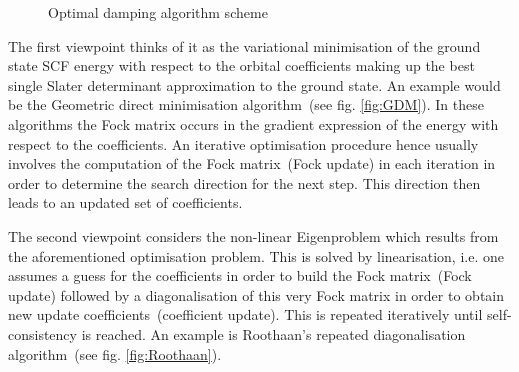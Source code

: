 \begin{figure}

	\centering
	\caption{Optimal damping algorithm scheme}
	\label{fig:ODA}
\end{figure}

The first viewpoint thinks of it as the variational minimisation
of the ground
state SCF energy with respect to the orbital coefficients making up
the best single Slater determinant approximation to the ground state.
An example would be the Geometric direct minimisation algorithm~(see fig. \ref{fig:GDM}).
In these algorithms the Fock matrix occurs in the gradient expression
of the energy with respect to the coefficients.
An iterative optimisation procedure hence
usually involves the computation of the Fock matrix~(Fock update)
in each iteration in order to determine the search direction
for the next step.
This direction then leads to an updated set of coefficients.

The second viewpoint considers the non-linear Eigenproblem
which results from the aforementioned optimisation problem.
This is solved by linearisation,
i.e. one assumes a guess for the coefficients
in order to build the Fock matrix~(Fock update)
followed by a diagonalisation of this very Fock matrix
in order to obtain new update coefficients~(coefficient update).
This is repeated iteratively until self-consistency is reached.
An example is Roothaan's repeated diagonalisation algorithm~(see fig. \ref{fig:Roothaan}).

